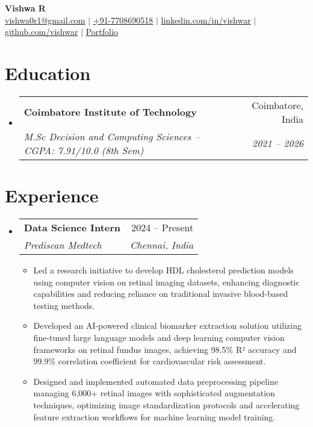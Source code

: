 \documentclass[letterpaper,11pt]{article}
\makeatletter
\newcommand{\resumeItem}[1]{
  \item\small{
    {#1 \vspace{-2pt}}
  }
}
\newcommand{\resumeSubheading}[4]{
  \vspace{-2pt}\item
    \begin{tabular*}{0.97\textwidth}[t]{l@{\extracolsep{\fill}}r}
      \textbf{#1} & #2 \\
      \textit{\small#3} & \textit{\small #4} \\
    \end{tabular*}\vspace{-7pt}
}
\newcommand{\resumeSubHeadingListStart}{\begin{itemize}[leftmargin=0.15in, label={}]}
\newcommand{\resumeSubHeadingListEnd}{\end{itemize}}
\newcommand{\resumeItemListStart}{\begin{itemize}}
\newcommand{\resumeItemListEnd}{\end{itemize}\vspace{-5pt}}
\makeatother
\begin{document}
\begin{center}
    \textbf{\Huge Vishwa R} \\ \vspace{1pt}
    \small
    \faEnvelope\hspace{1mm}\href{mailto:vishwa0r1@gmail.com}{vishwa0r1@gmail.com} $|$ 
    \faPhone\hspace{1mm}\href{tel:+917708690518}{+91-7708690518} $|$
    \href{https://linkedin.com/in/r-vishwa}{linkedin.com/in/vishwar} $|$ 
    \href{https://github.com/01Vishwa}{github.com/vishwar} $|$ 
    \faUser\hspace{1mm}\href{https://bento.me/vishwa01}{Portfolio} %
\end{center}

\section{Education}
  \resumeSubHeadingListStart
    \resumeSubheading
      {Coimbatore Institute of Technology}{Coimbatore, India}
      {M.Sc Decision and Computing Sciences – CGPA: 7.91/10.0 (8th Sem)}{2021 -- 2026}
  \resumeSubHeadingListEnd

\section{Experience}
  \resumeSubHeadingListStart
    \resumeSubheading
      {Data Science Intern}{2024 -- Present}
      {Prediscan Medtech}{Chennai, India}
      \resumeItemListStart
        \resumeItem{Led a research initiative to develop HDL cholesterol prediction models using computer vision on retinal imaging datasets, enhancing diagnostic capabilities and reducing reliance on traditional invasive blood-based testing methods.}
        \resumeItem{Developed an AI-powered clinical biomarker extraction solution utilizing fine-tuned large language models and deep learning computer vision frameworks on retinal fundus images, achieving 98.5\% R² accuracy and 99.9\% correlation coefficient for cardiovascular risk assessment.}
        \resumeItem{Designed and implemented automated data preprocessing pipeline managing 6,000+ retinal images with sophisticated augmentation techniques, optimizing image standardization protocols and accelerating feature extraction workflows for machine learning model training.}
      \resumeItemListEnd
  \resumeSubHeadingListEnd
\end{document}
